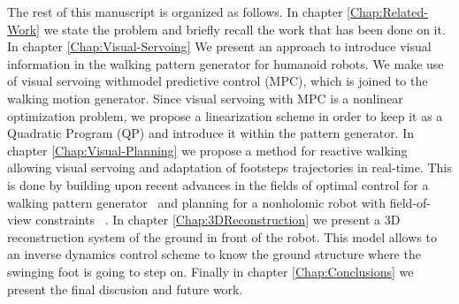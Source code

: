 The rest of this manuscript is organized as follows. In chapter \ref{Chap:Related-Work} we state the problem and briefly recall the work that has been done on it. In chapter \ref{Chap:Visual-Servoing} We present an approach to introduce visual information in the walking pattern generator for humanoid robots. We make use of visual servoing withmodel predictive control (MPC), which is joined to the walking motion generator. Since visual servoing with MPC is a nonlinear optimization problem, we propose a linearization scheme in order to keep it as a Quadratic Program (QP) and introduce it within the pattern generator. In chapter \ref{Chap:Visual-Planning} we propose a method for reactive walking allowing visual servoing and adaptation of footsteps trajectories in real-time. This is done by building upon recent advances in the fields of optimal control for a walking pattern generator~\citep{HerdtAR2010} and planning for a nonholomic robot with field-of-view constraints ~\citep{Salaris:2010}. In chapter \ref{Chap:3DReconstruction} we present a 3D reconstruction system of the ground in front of the robot. This model allows to an inverse dynamics control scheme to know the ground structure where the swinging foot is going to step on. Finally in chapter \ref{Chap:Conclusions} we present the final discusion and future work.


